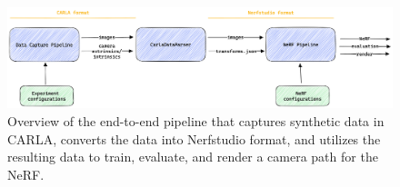 \begin{figure}[ht]
    \centering
    \includegraphics[width=1.0\textwidth]{figures/end-to-end-pipeline.png}
    \caption{Overview of the end-to-end pipeline that captures synthetic data in CARLA, converts the data into Nerfstudio format, and utilizes the resulting data to train, evaluate, and render a camera path for the NeRF.}
    \label{fig:end-to-end-pipeline}
\end{figure}